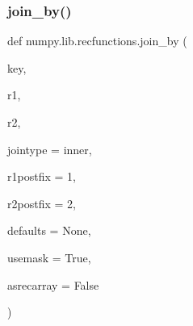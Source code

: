 \subsubsection{\texorpdfstring{join\+\_\+by()}{join\_by()}}
{\footnotesize\ttfamily def numpy.\+lib.\+recfunctions.\+join\+\_\+by (\begin{DoxyParamCaption}\item[{}]{key,  }\item[{}]{r1,  }\item[{}]{r2,  }\item[{}]{jointype = {\ttfamily \textquotesingle{}inner\textquotesingle{}},  }\item[{}]{r1postfix = {\ttfamily \textquotesingle{}1\textquotesingle{}},  }\item[{}]{r2postfix = {\ttfamily \textquotesingle{}2\textquotesingle{}},  }\item[{}]{defaults = {\ttfamily None},  }\item[{}]{usemask = {\ttfamily True},  }\item[{}]{asrecarray = {\ttfamily False} }\end{DoxyParamCaption})}

